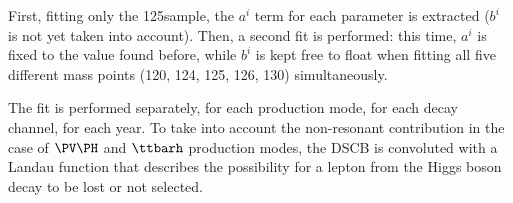 First, fitting only the 125\GeV sample, the $a^i$ term for each parameter is extracted ($b^i$ is not yet taken into account).
Then, a second fit is performed:
this time, $a^i$ is fixed to the value found before, while $b^i$ is kept free to float when fitting all five different mass points (120, 124, 125, 126, 130\GeV) simultaneously.

The fit is performed separately, for each production mode, for each decay channel, for each year. 
To take into account the non-resonant contribution in the case of $\PV\PH$ and $\ttbarh$ production modes, the 
DSCB is convoluted with a Landau function that describes the possibility for a 
lepton from the Higgs boson decay to be lost or not selected.\\
